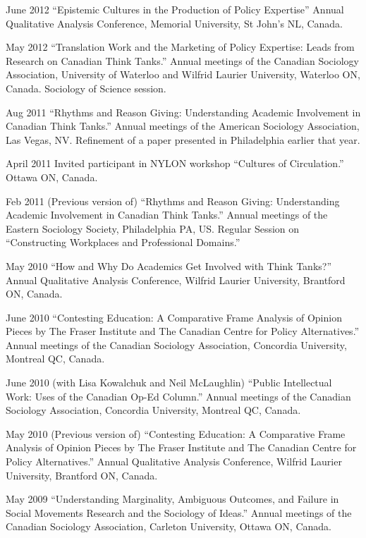 \ind June 2012 ``Epistemic Cultures in the Production of Policy
Expertise'' Annual Qualitative Analysis Conference, Memorial University,
St John's NL, Canada.

\ind May 2012 ``Translation Work and the Marketing of Policy Expertise:
Leads from Research on Canadian Think Tanks.'' Annual meetings of the
Canadian Sociology Association, University of Waterloo and Wilfrid
Laurier University, Waterloo ON, Canada. Sociology of Science session.

\ind Aug 2011 ``Rhythms and Reason Giving: Understanding Academic
Involvement in Canadian Think Tanks.'' Annual meetings of the American
Sociology Association, Las Vegas, NV. Refinement of a paper presented in
Philadelphia earlier that year.

\ind April 2011 Invited participant in NYLON workshop ``Cultures of
Circulation.'' Ottawa ON, Canada.

\ind Feb 2011 (Previous version of) ``Rhythms and Reason Giving:
Understanding Academic Involvement in Canadian Think Tanks.'' Annual
meetings of the Eastern Sociology Society, Philadelphia PA, US. Regular
Session on ``Constructing Workplaces and Professional Domains.''

\ind May 2010 ``How and Why Do Academics Get Involved with Think
Tanks?'' Annual Qualitative Analysis Conference, Wilfrid Laurier
University, Brantford ON, Canada.

\ind June 2010 ``Contesting Education: A Comparative Frame Analysis of
Opinion Pieces by The Fraser Institute and The Canadian Centre for
Policy Alternatives.'' Annual meetings of the Canadian Sociology
Association, Concordia University, Montreal QC, Canada.

\ind June 2010 (with Lisa Kowalchuk and Neil McLaughlin) ``Public
Intellectual Work: Uses of the Canadian Op-Ed Column.'' Annual meetings
of the Canadian Sociology Association, Concordia University, Montreal
QC, Canada.

\ind May 2010 (Previous version of) ``Contesting Education: A
Comparative Frame Analysis of Opinion Pieces by The Fraser Institute and
The Canadian Centre for Policy Alternatives.'' Annual Qualitative
Analysis Conference, Wilfrid Laurier University, Brantford ON, Canada.

\ind May 2009 ``Understanding Marginality, Ambiguous Outcomes, and
Failure in Social Movements Research and the Sociology of Ideas.''
Annual meetings of the Canadian Sociology Association, Carleton
University, Ottawa ON, Canada.

